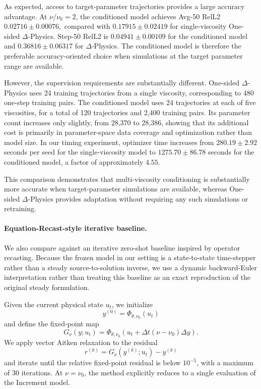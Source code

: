 \documentclass[10pt,twocolumn]{article}
\begin{document}
As expected, access to target-parameter trajectories provides a large
accuracy advantage. At $\nu/\nu_0=2$, the conditioned model achieves
Avg-50 RelL2
$    0.02716 \pm 0.00076,
$
compared with
$    0.17915 \pm 0.02419$
for single-viscosity One-sided $\Delta$-Physics. Step-50 RelL2 is
$0.04941\pm0.00109$ for the conditioned model and
$0.36816\pm0.06317$ for $\Delta$-Physics.
The conditioned model is therefore the preferable accuracy-oriented choice
when simulations at the target parameter range are available.

However, the supervision requirements are substantially different.
One-sided $\Delta$-Physics uses 24 training trajectories from a single
viscosity, corresponding to 480 one-step training pairs. The conditioned
model uses 24 trajectories at each of five viscosities, for a total of
120 trajectories and 2,400 training pairs. Its parameter count increases only
slightly, from 28,370 to 28,386, showing that its additional cost is primarily
in parameter-space data coverage and optimization rather than model size.
In our timing experiment, optimizer time increases from
$280.19\pm2.92$ seconds per seed for the single-viscosity model to
$1275.70\pm86.78$ seconds for the conditioned model, a factor of
approximately $4.55$.

This comparison demonstrates that
multi-viscosity conditioning is substantially more accurate when
target-parameter simulations are available, whereas One-sided
$\Delta$-Physics provides adaptation without requiring any such simulations
or retraining.

\paragraph{Equation-Recast-style iterative baseline.}
We also compare against an iterative zero-shot baseline inspired by operator
recasting. Because the frozen model in our setting is a state-to-state
time-stepper rather than a steady source-to-solution inverse, we use a dynamic
backward-Euler interpretation rather than treating this baseline as an exact
reproduction of the original steady formulation.

Given the current physical state $u_t$, we initialize
\begin{equation}
    y^{(0)}
    =
    \Phi_{\theta,\nu_0}(u_t)
\end{equation}
and define the fixed-point map
\begin{equation}
    G_\nu(y;u_t)
    =
    \Phi_{\theta,\nu_0}
    \left(
        u_t
        +
        \Delta t(\nu-\nu_0)\Delta y
    \right).
    \label{eq:dynamic_recast}
\end{equation}
We apply vector Aitken relaxation to the residual
\begin{equation}
    r^{(k)}
    =
    G_\nu(y^{(k)};u_t)-y^{(k)}
\end{equation}
and iterate until the relative fixed-point residual is below $10^{-5}$,
with a maximum of 30 iterations. At $\nu=\nu_0$, the method explicitly
reduces to a single evaluation of the Increment model.
\end{document}
